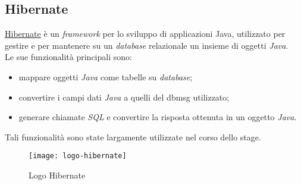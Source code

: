 \subsection{Hibernate}
\href{https://hibernate.org/}{Hibernate} è un \textit{framework} per lo sviluppo di applicazioni Java, utilizzato per gestire e per mantenere su un \textit{database} relazionale un insieme di oggetti \textit{Java}.
\\Le sue funzionalità principali sono:
\begin{itemize}
    \item mappare oggetti \textit{Java} come tabelle su \textit{database};
    \item convertire i campi dati \textit{Java} a quelli del \gls{dbmsg}\glsfirstoccur{}{} utilizzato;
    \item generare chiamate \textit{SQL} e convertire la risposta ottenuta in un oggetto \textit{Java}.
\end{itemize}
Tali funzionalità sono state largamente utilizzate nel corso dello stage.
\begin{figure}[h]
    \begin{center}
    \texttt{[image: logo-hibernate]}
    \caption{Logo Hibernate}
    \label{fig:figure5}
    \end{center}
\end{figure}

